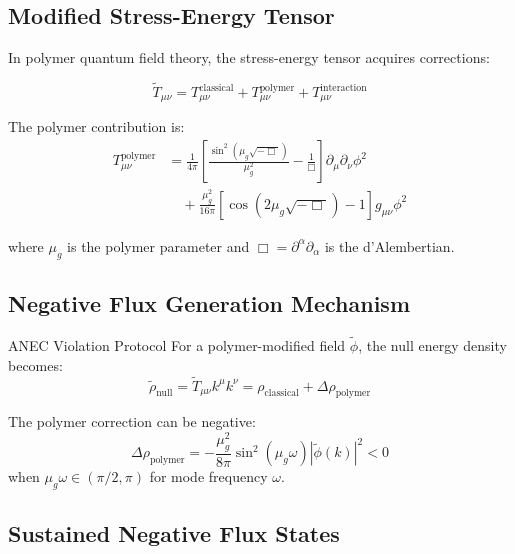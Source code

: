 \documentclass[12pt]{article}
\begin{document}
\subsection{Modified Stress-Energy Tensor}

In polymer quantum field theory, the stress-energy tensor acquires corrections:

\begin{equation}
\tilde{T}_{\mu\nu} = T_{\mu\nu}^{\text{classical}} + T_{\mu\nu}^{\text{polymer}} + T_{\mu\nu}^{\text{interaction}}
\end{equation}

The polymer contribution is:
\begin{align}
T_{\mu\nu}^{\text{polymer}} &= \frac{1}{4\pi}\left[ \frac{\sin^2(\mu_g \sqrt{-\Box})}{\mu_g^2} - \frac{1}{\Box} \right] \partial_{\mu}\partial_{\nu}\phi^2 \\
&\quad + \frac{\mu_g^2}{16\pi} \left[ \cos(2\mu_g \sqrt{-\Box}) - 1 \right] g_{\mu\nu} \phi^2
\end{align}

where $\mu_g$ is the polymer parameter and $\Box = \partial^{\alpha}\partial_{\alpha}$ is the d'Alembertian.

\subsection{Negative Flux Generation Mechanism}

\begin{physicsbox}{ANEC Violation Protocol}
For a polymer-modified field $\tilde{\phi}$, the null energy density becomes:
\begin{equation}
\tilde{\rho}_{\text{null}} = \tilde{T}_{\mu\nu} k^{\mu} k^{\nu} = \rho_{\text{classical}} + \Delta\rho_{\text{polymer}}
\end{equation}

The polymer correction can be negative:
\begin{equation}
\Delta\rho_{\text{polymer}} = -\frac{\mu_g^2}{8\pi} \sin^2(\mu_g \omega) \left| \tilde{\phi}(k) \right|^2 < 0
\end{equation}
when $\mu_g \omega \in (\pi/2, \pi)$ for mode frequency $\omega$.
\end{physicsbox}

\subsection{Sustained Negative Flux States}
\end{document}
